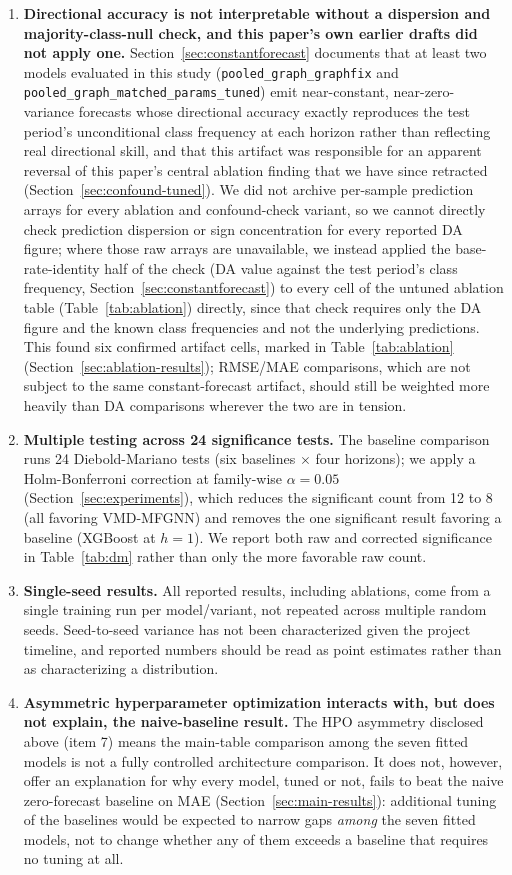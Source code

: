 \documentclass[journal]{IEEEtran}
\begin{document}
\begin{enumerate}
    \item \textbf{Directional accuracy is not interpretable without a dispersion and majority-class-null check, and this paper's own earlier drafts did not apply one.} Section~\ref{sec:constantforecast} documents that at least two models evaluated in this study (\texttt{pooled\_graph\_graphfix} and \texttt{pooled\_graph\_matched\_params\_tuned}) emit near-constant, near-zero-variance forecasts whose directional accuracy exactly reproduces the test period's unconditional class frequency at each horizon rather than reflecting real directional skill, and that this artifact was responsible for an apparent reversal of this paper's central ablation finding that we have since retracted (Section~\ref{sec:confound-tuned}). We did not archive per-sample prediction arrays for every ablation and confound-check variant, so we cannot directly check prediction dispersion or sign concentration for every reported DA figure; where those raw arrays are unavailable, we instead applied the base-rate-identity half of the check (DA value against the test period's class frequency, Section~\ref{sec:constantforecast}) to every cell of the untuned ablation table (Table~\ref{tab:ablation}) directly, since that check requires only the DA figure and the known class frequencies and not the underlying predictions. This found six confirmed artifact cells, marked in Table~\ref{tab:ablation} (Section~\ref{sec:ablation-results}); RMSE/MAE comparisons, which are not subject to the same constant-forecast artifact, should still be weighted more heavily than DA comparisons wherever the two are in tension.
    \item \textbf{Multiple testing across 24 significance tests.} The baseline comparison runs 24 Diebold-Mariano tests (six baselines $\times$ four horizons); we apply a Holm-Bonferroni correction at family-wise $\alpha=0.05$ (Section~\ref{sec:experiments}), which reduces the significant count from 12 to 8 (all favoring VMD-MFGNN) and removes the one significant result favoring a baseline (XGBoost at $h=1$). We report both raw and corrected significance in Table~\ref{tab:dm} rather than only the more favorable raw count.
    \item \textbf{Single-seed results.} All reported results, including ablations, come from a single training run per model/variant, not repeated across multiple random seeds. Seed-to-seed variance has not been characterized given the project timeline, and reported numbers should be read as point estimates rather than as characterizing a distribution.
    \item \textbf{Asymmetric hyperparameter optimization interacts with, but does not explain, the naive-baseline result.} The HPO asymmetry disclosed above (item 7) means the main-table comparison among the seven fitted models is not a fully controlled architecture comparison. It does not, however, offer an explanation for why every model, tuned or not, fails to beat the naive zero-forecast baseline on MAE (Section~\ref{sec:main-results}): additional tuning of the baselines would be expected to narrow gaps \emph{among} the seven fitted models, not to change whether any of them exceeds a baseline that requires no tuning at all.
\end{enumerate}
\end{document}

